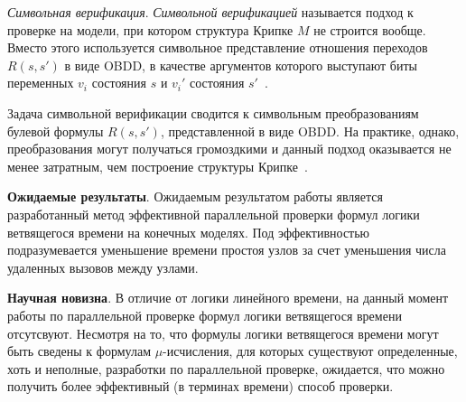 \documentclass[a4paper,notitlepage,14pt]{article}
\begin{document}
\textit{Символьная верификация}. \emph{Символьной верификацией} называется подход к
проверке на модели, при котором структура Крипке $M$ не строится вообще. Вместо этого
используется символьное представление отношения переходов $R(s, s')$ в виде OBDD, в
качестве аргументов которого выступают биты переменных $v_i$ состояния $s$ и $v_i'$
состояния $s'$~\cite{Clarke}.

Задача символьной верификации сводится к символьным преобразованиям булевой формулы $R(s,
s')$, представленной в виде OBDD. На практике, однако, преобразования могут получаться
громоздкими и данный подход оказывается не менее затратным, чем построение структуры
Крипке~\cite{Stern97parallelizingthe}.


\textbf{Ожидаемые результаты}. Ожидаемым результатом работы является разработанный метод
эффективной параллельной проверки формул логики ветвящегося времени на конечных
моделях. Под эффективностью подразумевается уменьшение времени простоя узлов за счет
уменьшения числа удаленных вызовов между узлами.

\textbf{Научная новизна}. В отличие от логики линейного времени, на данный момент работы
по параллельной проверке формул логики ветвящегося времени отсутсвуют. Несмотря на то, что
формулы логики ветвящегося времени могут быть сведены к формулам $\mu$-исчисления, для
которых существуют определенные, хоть и неполные, разработки по параллельной проверке,
ожидается, что можно получить более эффективный (в терминах времени) способ проверки.



\end{document}
